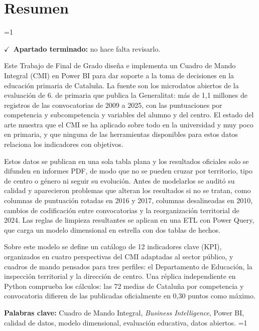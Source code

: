 \documentclass[12pt, a4paper, oneside]{report}
\newcommand{\mostrarterminados}{1}
\newenvironment{revisado}
  {\ifnum\mostrarterminados=1\relax\begin{cajarevisada}\noindent\colorbox{verdeterminado}{\parbox{\dimexpr\linewidth-2\fboxsep\relax}{\small$\checkmark$\ \textbf{Apartado terminado:} no hace falta revisarlo.}}\par\medskip\fi}
  {\ifnum\mostrarterminados=1\relax\end{cajarevisada}\fi}
\begin{document}
\chapter*{Resumen}
\begin{revisado}
Este Trabajo de Final de Grado diseña e implementa un Cuadro de Mando Integral (CMI) en Power BI para dar soporte a la toma de decisiones en la educación primaria de Cataluña. La fuente son los microdatos abiertos de la evaluación de 6.\textordmasculine{} de primaria que publica la Generalitat: más de 1,1 millones de registros de las convocatorias de 2009 a 2025, con las puntuaciones por competencia y subcompetencia y variables del alumno y del centro. El estado del arte muestra que el CMI se ha aplicado sobre todo en la universidad y muy poco en primaria, y que ninguna de las herramientas disponibles para estos datos relaciona los indicadores con objetivos.

Estos datos se publican en una sola tabla plana y los resultados oficiales solo se difunden en informes PDF, de modo que no se pueden cruzar por territorio, tipo de centro o género ni seguir su evolución. Antes de modelarlos se auditó su calidad y aparecieron problemas que alteran los resultados si no se tratan, como columnas de puntuación rotadas en 2016 y 2017, columnas desalineadas en 2010, cambios de codificación entre convocatorias y la reorganización territorial de 2024. Las reglas de limpieza resultantes se aplican en una ETL con Power Query, que carga un modelo dimensional en estrella con dos tablas de hechos.

Sobre este modelo se define un catálogo de 12 indicadores clave (KPI), organizados en cuatro perspectivas del CMI adaptadas al sector público, y cuadros de mando pensados para tres perfiles: el Departamento de Educación, la inspección territorial y la dirección de centro. Una réplica independiente en Python comprueba los cálculos: las 72 medias de Cataluña por competencia y convocatoria difieren de las publicadas oficialmente en 0,30 puntos como máximo.

\vspace{0.5cm}
\noindent\textbf{Palabras clave:} Cuadro de Mando Integral, \textit{Business Intelligence}, Power BI, calidad de datos, modelo dimensional, evaluación educativa, datos abiertos.
\end{revisado}
\end{document}
